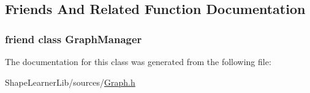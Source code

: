 \subsection{Friends And Related Function Documentation}
\hypertarget{class_graph_1_1_access_a4f73c83d7340dc64ca31fa4fdf2ab4b8}{}
\subsubsection[{Graph\+Manager}]{\setlength{\rightskip}{0pt plus 5cm}friend class {\bf Graph\+Manager}\hspace{0.3cm}{\ttfamily [friend]}}\label{class_graph_1_1_access_a4f73c83d7340dc64ca31fa4fdf2ab4b8}


The documentation for this class was generated from the following file\+:\begin{DoxyCompactItemize}
\item 
Shape\+Learner\+Lib/sources/\hyperlink{_graph_8h}{Graph.\+h}\end{DoxyCompactItemize}
